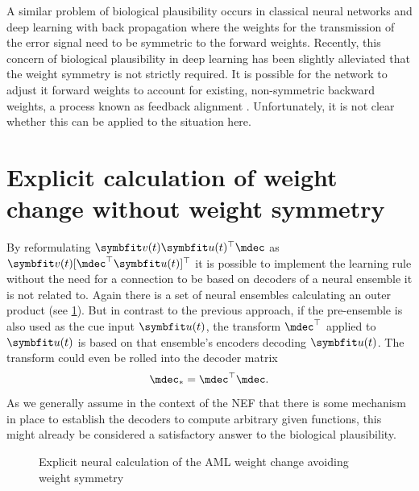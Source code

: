 A similar problem of biological plausibility occurs in classical neural networks and deep learning with back propagation where the weights for the transmission of the error signal need to be symmetric to the forward weights.
Recently, this concern of biological plausibility in deep learning has been slightly alleviated that the weight symmetry is not strictly required.
It is possible for the network to adjust it forward weights to account for existing, non-symmetric backward weights, a process known as feedback alignment \parencite{lillicrap2016}.
Unfortunately, it is not clear whether this can be applied to the situation here.


\section{Explicit calculation of weight change without weight symmetry}
By reformulating $\vc v(t) \vc u(t)\Tr \mdec$ as $\vc v(t)[\mdec\Tr \vc u(t)]\Tr$ it is possible to implement the learning rule without the need for a connection to be based on decoders of a neural ensemble it is not related to.
Again there is a set of neural ensembles calculating an outer product (see \cref{fig:aml-explicit-no-sym}).
But in contrast to the previous approach, if the pre-ensemble is also used as the cue input $\vc u(t)$, the transform $\mdec\Tr$ applied to $\vc u(t)$ is based on that ensemble's encoders decoding $\vc u(t)$.
The transform could even be rolled into the decoder matrix
\begin{equation}
    \mdec_{*} = \mdec\Tr \mdec \text{.}
\end{equation}
As we generally assume in the context of the NEF that there is some mechanism in place to establish the decoders to compute arbitrary given functions, this might already be considered a satisfactory answer to the biological plausibility.
\begin{figure}
    \centering
    \caption{Explicit neural calculation of the AML weight change avoiding weight symmetry}\label{fig:aml-explicit-no-sym}
\end{figure}

